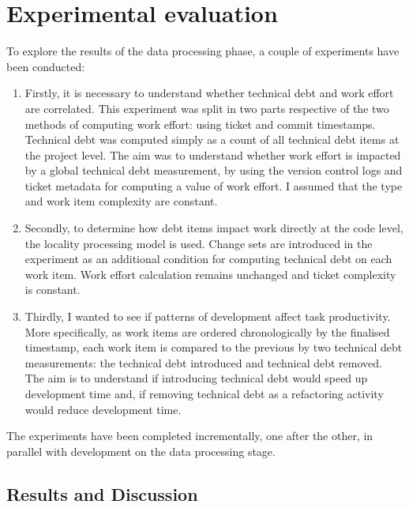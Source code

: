 \documentclass{mpaper}
\begin{document}
\section{Experimental evaluation}
\label{evaluation}

To explore the results of the data processing phase, a couple of experiments
have been conducted:

\begin{enumerate}
  
  \item Firstly, it is necessary to understand whether technical debt and work
  effort are correlated. This experiment was split in two parts respective of
  the two methods of computing work effort: using ticket and commit timestamps.
  Technical debt was computed simply as a count of all technical debt items at
  the project level. The aim was to understand whether work effort is impacted
  by a global technical debt measurement, by using the version control logs and
  ticket metadata for computing a value of work effort. I assumed that the type
  and work item complexity are constant.

  \item Secondly, to determine how debt items impact work directly at the code
  level, the locality processing model is used. Change sets are introduced in
  the experiment as an additional condition for computing technical debt on each
  work item. Work effort calculation remains unchanged and ticket complexity is
  constant.
  
  \item Thirdly, I wanted to see if patterns of development affect task
  productivity. More specifically, as work items are ordered chronologically by
  the finalised timestamp, each work item is compared to the previous by two
  technical debt measurements: the technical debt introduced and technical debt
  removed. The aim is to understand if introducing technical debt would speed up
  development time and, if removing technical debt as a refactoring activity
  would reduce development time.  
\end{enumerate}

The experiments have been completed incrementally, one after the other, in
parallel with development on the data processing stage. 

\subsection{Results and Discussion}
\label{results-discussion}
\end{document}
